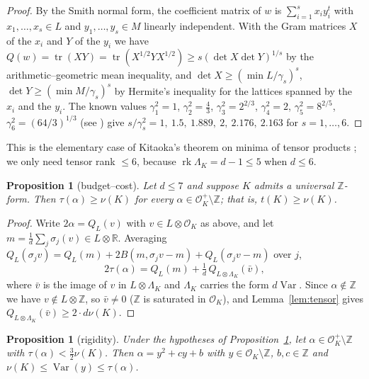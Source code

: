 \documentclass[11pt]{amsart}
\newtheorem{proposition}[theorem]{Proposition}
\theoremstyle{definition}
\DeclareMathOperator{\Var}{Var}
\DeclareMathOperator{\rk}{rk}
\newcommand{\OK}{\mathcal{O}_K}
\newcommand{\Z}{\mathbb{Z}}
\newcommand{\R}{\mathbb{R}}
\newcommand{\LamK}{\Lambda_K}
\begin{document}
\begin{proof}
By the Smith normal form, the coefficient matrix of $w$ is $\sum_{i=1}^s x_iy_i^t$ with
$x_1,\dots,x_s\in L$ and $y_1,\dots,y_s\in M$ linearly independent.  With the Gram
matrices $X$ of the $x_i$ and $Y$ of the $y_i$ we have $Q(w)=\operatorname{tr}(XY)
=\operatorname{tr}(X^{1/2}YX^{1/2})\ge s(\det X\det Y)^{1/s}$ by the arithmetic--geometric
mean inequality, and $\det X\ge(\min L/\gamma_s)^s$, $\det Y\ge(\min M/\gamma_s)^s$ by
Hermite's inequality for the lattices spanned by the $x_i$ and the $y_i$.  The known values
$\gamma_1^2=1$, $\gamma_2^2=\frac43$, $\gamma_3^2=2^{2/3}$, $\gamma_4^2=2$,
$\gamma_5^2=8^{2/5}$, $\gamma_6^2=(64/3)^{1/3}$ (see \cite{CS}) give
$s/\gamma_s^2=1,\ 1.5,\ 1.889,\ 2,\ 2.176,\ 2.163$ for $s=1,\dots,6$.
\end{proof}

This is the elementary case of Kitaoka's theorem on minima of tensor products \cite{Ki}; we
only need tensor rank $\le6$, because $\rk\LamK=d-1\le5$ when $d\le 6$.

\begin{proposition}[budget--cost]\label{prop:budget}
Let $d\le7$ and suppose $K$ admits a universal $\Z$-form.  Then $\tau(\alpha)\ge\nu(K)$ for
every $\alpha\in\OK^+\setminus\Z$; that is, $t(K)\ge\nu(K)$.
\end{proposition}

\begin{proof}
Write $2\alpha=Q_L(v)$ with $v\in L\otimes\OK$ as above, and let $m=\frac1d\sum_j\sigma_j(v)\in
L\otimes\R$.  Averaging $Q_L(\sigma_jv)=Q_L(m)+2B(m,\sigma_jv-m)+Q_L(\sigma_jv-m)$ over $j$,
\begin{equation}\label{eq:decomp}
2\tau(\alpha)=Q_L(m)+\tfrac1d\,Q_{L\otimes\LamK}(\bar v),
\end{equation}
where $\bar v$ is the image of $v$ in $L\otimes\LamK$ and $\LamK$ carries the form $d\Var$.
Since $\alpha\notin\Z$ we have $v\notin L\otimes\Z$, so $\bar v\ne0$ ($\Z$ is saturated in
$\OK$), and Lemma~\ref{lem:tensor} gives $Q_{L\otimes\LamK}(\bar v)\ge 2\cdot d\nu(K)$.
\end{proof}

\begin{proposition}[rigidity]\label{prop:rigidity}
Under the hypotheses of Proposition~\ref{prop:budget}, let $\alpha\in\OK^+\setminus\Z$ with
$\tau(\alpha)<\frac32\nu(K)$.  Then $\alpha=y^2+cy+b$ with $y\in\OK\setminus\Z$, $b,c\in\Z$ and
$\nu(K)\le\Var(y)\le\tau(\alpha)$.
\end{proposition}
\end{document}

